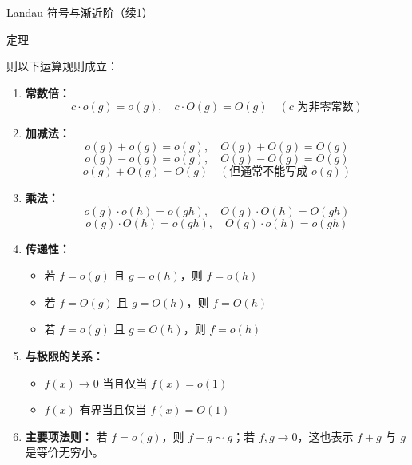 \documentclass[aspectratio=169,10pt,fontset=fandol]{ctexbeamer}
\begin{document}
\begin{frame}[t,fragile]{Landau 符号与渐近阶（续1）}
\footnotesize
\begin{block}{定理}
{\footnotesize
则以下运算规则成立：

\begin{enumerate}
\item \textbf{常数倍：}
   \[
   c \cdot o(g) = o(g),\quad c \cdot O(g) = O(g) \quad (c \text{ 为非零常数})
   \]

\item \textbf{加减法：}
   \[
   o(g) + o(g) = o(g),\quad O(g) + O(g) = O(g)
   \]
   \[
   o(g) - o(g) = o(g),\quad O(g) - O(g) = O(g)
   \]
   \[
   o(g) + O(g) = O(g) \quad (\text{但通常不能写成 } o(g))
   \]

\item \textbf{乘法：}
   \[
   o(g) \cdot o(h) = o(gh),\quad O(g) \cdot O(h) = O(gh)
   \]
   \[
   o(g) \cdot O(h) = o(gh),\quad O(g) \cdot o(h) = o(gh)
   \]

\item \textbf{传递性：}
   \begin{itemize}
   \item 若 \(f = o(g)\) 且 \(g = o(h)\)，则 \(f = o(h)\)
   \item 若 \(f = O(g)\) 且 \(g = O(h)\)，则 \(f = O(h)\)
   \item 若 \(f = o(g)\) 且 \(g = O(h)\)，则 \(f = o(h)\)
   \end{itemize}

\item \textbf{与极限的关系：}
   \begin{itemize}
   \item \(f(x) \to 0\) 当且仅当 \(f(x) = o(1)\)
   \item \(f(x)\) 有界当且仅当 \(f(x) = O(1)\)
   \end{itemize}

\item \textbf{主要项法则：} 若 \(f=o(g)\)，则 \(f+g\sim g\)；若 \(f,g\to0\)，这也表示 \(f+g\) 与 \(g\) 是等价无穷小。
\end{enumerate}

}
\end{block}
\end{frame}
\end{document}
